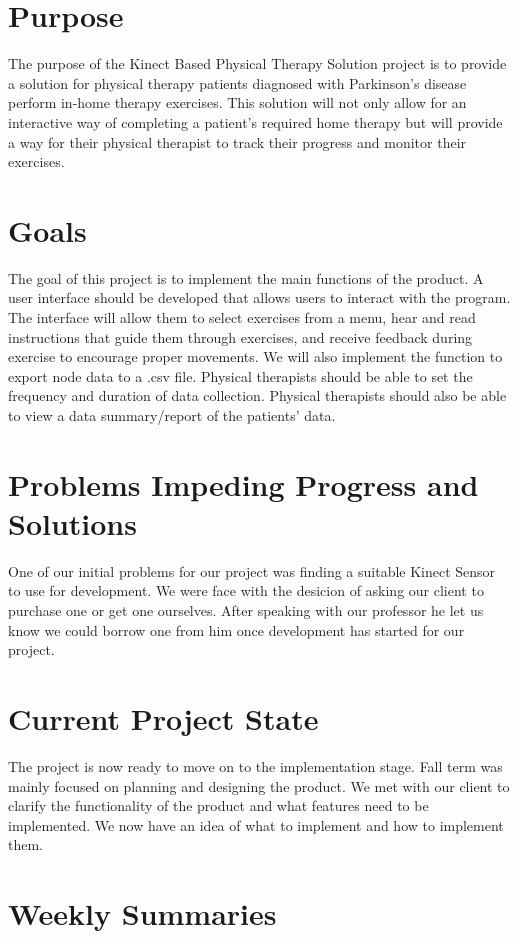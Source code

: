 \documentclass[onecolumn, draftclsnofoot,10pt, compsoc]{IEEEtran}
\begin{document}
\section{Purpose}
The purpose of the Kinect Based Physical Therapy Solution project is to provide a solution for physical therapy patients diagnosed with Parkinson's disease perform in-home therapy exercises. This solution will not only allow for an interactive way of completing a patient's required home therapy but will provide a way for their physical therapist to track their progress and monitor their exercises.

\section{Goals}
The goal of this project is to implement the main functions of the product. A user interface should be developed that allows users to interact with the program. The interface will allow them to select exercises from a menu, hear and read instructions that guide them through exercises, and receive feedback during exercise to encourage proper movements. We will also implement the function to export node data to a .csv file. Physical therapists should be able to set the frequency and duration of data collection. Physical therapists should also be able to view a data summary/report of the patients' data.

\section{Problems Impeding Progress and Solutions}
One of our initial problems for our project was finding a suitable Kinect Sensor to use for development. We were face with the desicion of asking our client to purchase one or get one ourselves. After speaking with our professor he let us know we could borrow one from him once development has started for our project.

\section{Current Project State}
The project is now ready to move on to the implementation stage. Fall term was mainly focused on planning and designing the product. We met with our client to clarify the functionality of the product and what features need to be implemented. We now have an idea of what to implement and how to implement them.

\section{Weekly Summaries}
\end{document}
